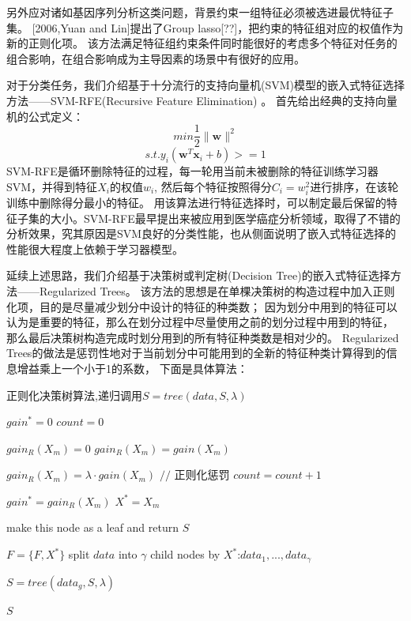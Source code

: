 \documentclass[a4paper,UTF8]{article}
\begin{document}
另外应对诸如基因序列分析这类问题，背景约束一组特征必须被选进最优特征子集。
[2006,Yuan and Lin]提出了Group lasso[??]，把约束的特征组对应的权值作为新的正则化项。
该方法满足特征组约束条件同时能很好的考虑多个特征对任务的组合影响，在组合影响成为主导因素的场景中有很好的应用。


对于分类任务，我们介绍基于十分流行的支持向量机(SVM)模型的嵌入式特征选择方法——SVM-RFE(Recursive Feature Elimination)
\cite{DBLP:journals/ml/GuyonWBV02}。
首先给出经典的支持向量机的公式定义：
$$ min \frac{1}{2}\parallel \textbf{w} \parallel^{2} $$
$$ s.t. y_{i}(\textbf{w}^{T}\textbf{x}_{i}+b)>=1 $$
SVM-RFE是循环删除特征的过程，每一轮用当前未被删除的特征训练学习器SVM，并得到特征$X_{i}$的权值$w_{i}$,
然后每个特征按照得分$C_{i}=w_{i}^{2}$进行排序，在该轮训练中删除得分最小的特征。
用该算法进行特征选择时，可以制定最后保留的特征子集的大小。SVM-RFE最早提出来被应用到医学癌症分析领域，取得了不错的
分析效果，究其原因是SVM良好的分类性能，也从侧面说明了嵌入式特征选择的性能很大程度上依赖于学习器模型。


延续上述思路，我们介绍基于决策树或判定树(Decision Tree)的嵌入式特征选择方法——Regularized Trees。
该方法的思想是在单棵决策树的构造过程中加入正则化项，目的是尽量减少划分中设计的特征的种类数；
因为划分中用到的特征可以认为是重要的特征，那么在划分过程中尽量使用之前的划分过程中用到的特征，
那么最后决策树构造完成时划分用到的所有特征种类数是相对少的。
Regularized Trees的做法是惩罚性地对于当前划分中可能用到的全新的特征种类计算得到的信息增益乘上一个小于1的系数，
下面是具体算法\cite{DBLP:conf/ijcnn/DengR12}：

\begin{algorithm}
  \caption{正则化决策树算法,递归调用$S=tree(data,S,\lambda)$}
  \begin{algorithmic}[1]

    \STATE $gain^{*}=0$
    \STATE $count=0$

      \STATE $gain_{R}(X_{m})=0$
        \STATE $gain_{R}(X_{m})=gain(X_{m})$
      \ENDIF

        \STATE $gain_{R}(X_{m})=\lambda \cdot gain(X_{m})$ $//$ 正则化惩罚
        \STATE $count=count+1$
      \ENDIF

        \STATE $gain^{*}=gain_{R}(X_{m})$
        \STATE $X^{*}=X_{m}$
      \ENDIF

    \ENDFOR

      \STATE make this node as a leaf and return $S$
    \ENDIF

      \STATE $F=\{F,X^{*}\}$
    \ENDIF
    \STATE split $data$ into $\gamma$ child nodes by $X^{*}$:$data_{1},...,data_{\gamma}$

      \STATE $S=tree(data_{g},S,\lambda)$
    \ENDFOR

    \RETURN $S$
  \end{algorithmic}

\end{algorithm}
\end{document}
